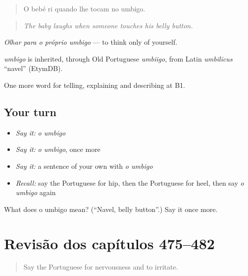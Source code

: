 \begin{quote}
O bebé ri quando lhe tocam no umbigo.
\end{quote}

\begin{quote}
\emph{The baby laughs when someone touches his belly button.}
\end{quote}

\emph{Olhar para o próprio umbigo} — to think only of yourself.

\begin{cousinweb}
\emph{umbigo} is inherited, through Old Portuguese \emph{umbiigo}, from Latin \emph{umbilīcus} \textquotedblleft{}navel\textquotedblright{} (EtymDB).
\end{cousinweb}

\begin{grammarlens}[title={What you've built}]
One more word for telling, explaining and describing at B1.
\end{grammarlens}

\subsection*{Your turn}
\begin{itemize}
\raggedright
  \item \emph{Say it:} \emph{o umbigo}
  \item \emph{Say it:} \emph{o umbigo}, once more
  \item \emph{Say it:} a sentence of your own with \emph{o umbigo}
  \item \emph{Recall:} say the Portuguese for hip, then the Portuguese for heel, then say \emph{o umbigo} again
\end{itemize}

\begin{tcolorbox}[breakable,colback=teal!4,colframe=teal!35!black,title={Before you move on}]
What does o umbigo mean? (\textquotedblleft{}Navel, belly button\textquotedblright{}.) Say it once more.
\end{tcolorbox}
\section[(dialogue)]{Revisão dos capítulos 475–482}

\label{lesson:PT-R482-revisao-475-482}



\begin{quote}
Say the Portuguese for nervousness and to irritate.
\end{quote}

